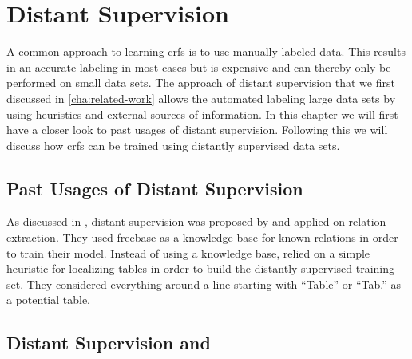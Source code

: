 \chapter{Distant Supervision}\label{cha:distant-supervision}

A common approach to learning \glspl{crf} is to use manually labeled data.
This results in an accurate labeling in most cases but is expensive and can thereby only be performed on small data sets.
The approach of \gls{distant supervision} that we first discussed in \cref{cha:related-work} allows the automated labeling large data sets by using heuristics and external sources of information.
In this chapter we will first have a closer look to past usages of \gls{distant supervision}.
Following this we will discuss how \glspl{crf} can be trained using distantly supervised data sets.

%

\section{Past Usages of Distant Supervision}
As discussed in , \gls{distant supervision} was proposed by \citet{mintz2009distant} and applied on relation extraction.
They used \gls{freebase} as a knowledge base for known relations in order to train their model.
%
Instead of using a knowledge base, \citet{fan2015detecting} relied on a simple heuristic for localizing tables in order to build the distantly supervised training set.
They considered everything around a line starting with ``Table'' or ``Tab.'' as a potential table.
\section{Distant Supervision and }


